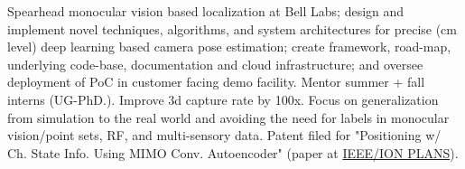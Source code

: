 \documentclass[]{deedy-resume-openfont}
\begin{document}
\begin{minipage}[t]{0.58\textwidth} 



\vspace{-0.1cm} %
 \newline





Spearhead monocular vision based localization at Bell Labs; design and implement novel techniques, algorithms, and system architectures for precise (cm level) deep learning based camera pose estimation; create framework, road-map, underlying code-base, documentation and cloud infrastructure; and oversee deployment of PoC in customer facing demo facility. Mentor summer + fall interns (UG-PhD.). Improve 3d capture rate by 100x. Focus on generalization from simulation to the real world and avoiding the need for labels in monocular vision/point sets,  RF, and multi-sensory data. Patent filed for "Positioning w/ Ch. State Info. Using MIMO Conv. Autoencoder" (paper at \href{https://www.ion.org/plans/abstracts.cfm?paperID=8295}{IEEE/ION PLANS}).


\sectionseplg





\end{minipage}
\end{document}
